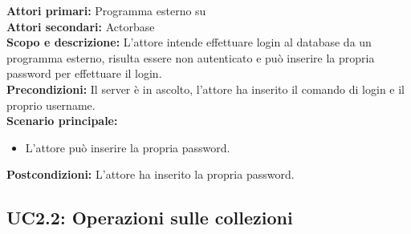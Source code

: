 \documentclass{scalatekids-article}
\begin{document}
\textbf{Attori primari:} Programma esterno su \\
\textbf{Attori secondari:} Actorbase\\
\textbf{Scopo e descrizione:}
L'attore intende effettuare login al database da un programma  esterno, risulta essere non autenticato e può inserire la propria password per effettuare il login.\\
\textbf{Precondizioni:} Il server è in ascolto, l'attore ha inserito il comando di login e il proprio username.\\
\textbf{Scenario principale:}
\begin{itemize}
\item L'attore può inserire la propria password.
\end{itemize}
\textbf{Postcondizioni:} L'attore ha inserito la propria password.

\subsection{UC2.2: Operazioni sulle collezioni}
\end{document}
